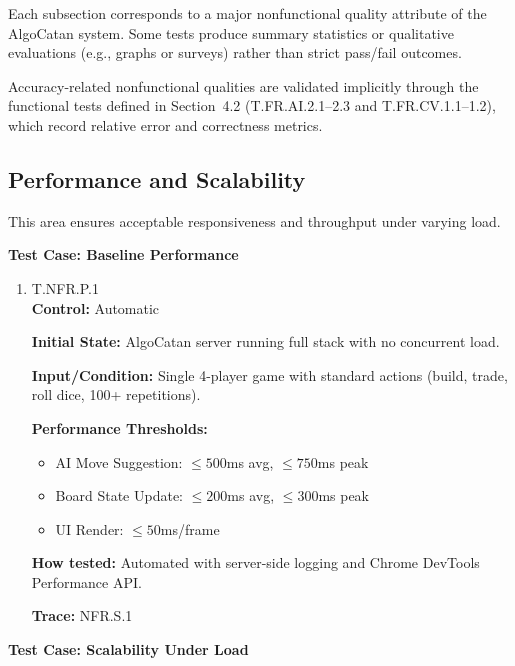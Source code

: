 \documentclass[12pt, titlepage]{article}
\begin{document}
Each subsection corresponds to a major nonfunctional quality attribute of the AlgoCatan system. Some tests produce summary statistics or qualitative evaluations (e.g., graphs or surveys) rather than strict pass/fail outcomes.  

Accuracy-related nonfunctional qualities are validated implicitly through the functional tests defined in Section~4.2 (T.FR.AI.2.1--2.3 and T.FR.CV.1.1--1.2), which record relative error and correctness metrics.

\subsection{Performance and Scalability}

This area ensures acceptable responsiveness and throughput under varying load.

\textbf{Test Case: Baseline Performance}

\begin{enumerate}
\item{\hypertarget{T.NFR.P.1}{T.NFR.P.1}\\}
\textbf{Control:} Automatic

\textbf{Initial State:} AlgoCatan server running full stack with no concurrent load.

\textbf{Input/Condition:} Single 4-player game with standard actions (build, trade, roll dice, 100+ repetitions).

\textbf{Performance Thresholds:}
\begin{itemize}
    \item AI Move Suggestion: $\leq 500$ms avg, $\leq 750$ms peak
    \item Board State Update: $\leq 200$ms avg, $\leq 300$ms peak
    \item UI Render: $\leq 50$ms/frame
\end{itemize}

\textbf{How tested:} Automated with server-side logging and Chrome DevTools Performance API.

\textbf{Trace:} NFR.S.1
\end{enumerate}

\textbf{Test Case: Scalability Under Load}
\end{document}
